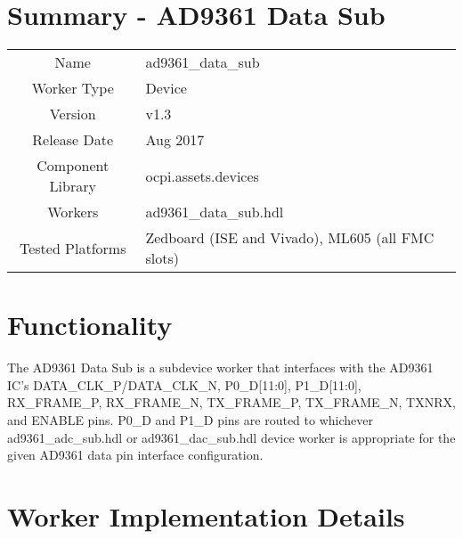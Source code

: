 \documentclass{article}
\author{} %
\date{Version \docVersion} %
\title{\docTitle}
\def\docVersion{1.3}
\def\comp{ad9361\_data\_sub}
\def\Comp{AD9361 Data Sub}
\begin{document}
\section*{Summary - \Comp}
\begin{tabular}{|c|M{13.5cm}|}
	\hline
	                  &                  \\
	\hline
	Name              & \comp            \\
	\hline
	Worker Type       & Device           \\
	\hline
	Version           & v\docVersion     \\
	\hline
	Release Date      & Aug 2017         \\
	\hline
	Component Library & ocpi.assets.devices     \\
	\hline
	Workers           & \comp.hdl        \\
	\hline
	Tested Platforms  &  Zedboard (ISE and Vivado), ML605 (all FMC slots) \\
	\hline
\end{tabular}

\section*{Functionality}
	The \Comp{} is a subdevice worker that interfaces with the AD9361 IC\cite{ad9361}'s DATA\_CLK\_P/DATA\_CLK\_N, P0\_D[11:0], P1\_D[11:0], RX\_FRAME\_P, RX\_FRAME\_N, TX\_FRAME\_P, TX\_FRAME\_N, TXNRX, and ENABLE pins. P0\_D and P1\_D pins are routed to whichever ad9361\_adc\_sub.hdl or ad9361\_dac\_sub.hdl device worker is appropriate for the given AD9361 data pin interface configuration.

\section*{Worker Implementation Details}
\end{document}
